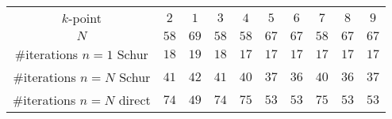 \begin{tabular}{cccccccccc}
$k$-point & $2$ & $1$ & $3$ & $4$ & $5$ & $6$ & $7$ & $8$ & $9$\\
$N$ & $58$ & $69$ & $58$ & $58$ & $67$ & $67$ & $58$ & $67$ & $67$\\
\#iterations $n=1$ Schur & $18$ & $19$ & $18$ & $17$ & $17$ & $17$ & $17$ & $17$ & $17$\\
\#iterations $n=N$ Schur & $41$ & $42$ & $41$ & $40$ & $37$ & $36$ & $40$ & $36$ & $37$\\
\#iterations $n=N$ direct & $74$ & $49$ & $74$ & $75$ & $53$ & $53$ & $75$ & $53$ & $53$\\
\end{tabular}
